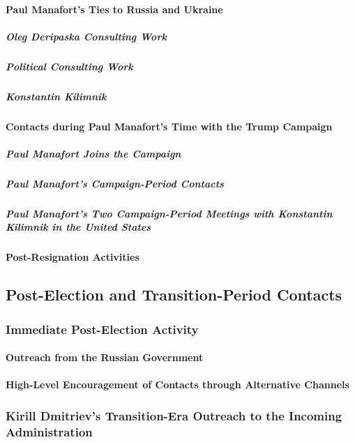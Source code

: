 \paragraph{Paul Manafort's Ties to Russia and Ukraine}

\subparagraph{Oleg Deripaska Consulting Work}

\subparagraph{Political Consulting Work}

\subparagraph{Konstantin Kilimnik}

\paragraph{Contacts during Paul Manafort's Time with the Trump Campaign}

\subparagraph{Paul Manafort Joins the Campaign}

\subparagraph{Paul Manafort's Campaign-Period Contacts}

\subparagraph{Paul Manafort's Two Campaign-Period Meetings with Konstantin Kilimnik in the United States}

\paragraph{Post-Resignation Activities}

\subsection{Post-Election and Transition-Period Contacts}

\subsubsection{Immediate Post-Election Activity}

\paragraph{Outreach from the Russian Government}

\paragraph{High-Level Encouragement of Contacts through Alternative Channels}

\subsubsection{Kirill Dmitriev's Transition-Era Outreach to the Incoming Administration}

